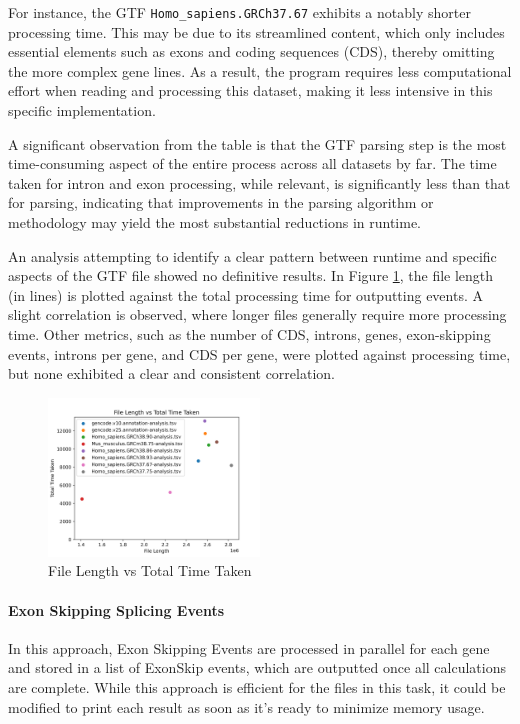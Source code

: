 \documentclass{article}
\begin{document}
    For instance, the GTF \texttt{Homo\_sapiens.GRCh37.67} exhibits a notably shorter processing time. This may be due to its streamlined content, which only includes essential elements such as exons and coding sequences (CDS), thereby omitting the more complex gene lines. As a result, the program requires less computational effort when reading and processing this dataset, making it less intensive in this specific implementation.

    A significant observation from the table is that the GTF parsing step is the most time-consuming aspect of the entire process across all datasets by far. The time taken for intron and exon processing, while relevant, is significantly less than that for parsing, indicating that improvements in the parsing algorithm or methodology may yield the most substantial reductions in runtime.


    An analysis attempting to identify a clear pattern between runtime and specific aspects of the GTF file showed no definitive results. In Figure \ref{fig:length_vs_time_taken}, the file length (in lines) is plotted against the total processing time for outputting events. A slight correlation is observed, where longer files generally require more processing time. Other metrics, such as the number of CDS, introns, genes, exon-skipping events, introns per gene, and CDS per gene, were plotted against processing time, but none exhibited a clear and consistent correlation.
    \begin{figure}[H]
        \centering
        \includegraphics[width=0.5\textwidth]{figures/exonskipping/length_vs_time_taken}
        \caption{File Length vs Total Time Taken}
        \label{fig:length_vs_time_taken}
    \end{figure}

    \paragraph{Exon Skipping Splicing Events}
    In this approach, Exon Skipping Events are processed in parallel for each gene and stored in a list of ExonSkip events, which are outputted once all calculations are complete. While this approach is efficient for the files in this task, it could be modified to print each result as soon as it's ready to minimize memory usage.
\end{document}
